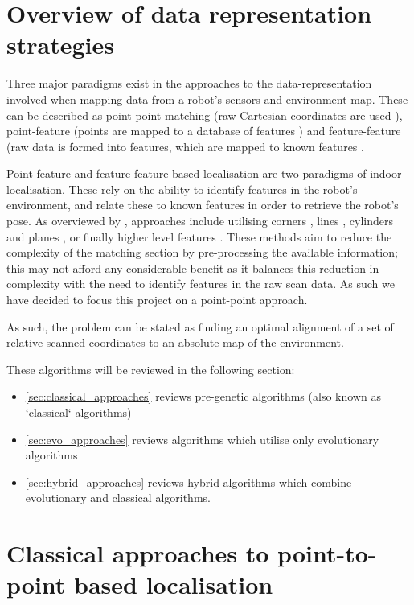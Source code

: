 \documentclass[authoryearcitations]{UoYCSproject}
\begin{document}
\section{Overview of data representation strategies}
Three major paradigms exist in the approaches to the data-representation involved when mapping data from a robot's sensors and environment map. These can be described as point-point matching (raw Cartesian coordinates are used \cite{Lu1997-zv}), point-feature (points are mapped to a database of features \cite{Censi2008-ik}) and feature-feature (raw data is formed into features, which are mapped to known features \cite{Reina2000-vq}. 

Point-feature and feature-feature based localisation are two paradigms of indoor localisation. These rely on the ability to identify features in the robot's environment, and relate these to known features in order to retrieve the robot's pose. As overviewed by \citet{Filliat2003-ay}, approaches include utilising corners \cite{Borghi1995-pi} \cite{Hebert1996-rc}, lines \cite{Moutarlier1990-ld} \cite{Einsele1997-dl}, cylinders and planes \cite{Leonard1990-hx}, or finally higher level features \cite{Ayache1990-ok}. These methods aim to reduce the complexity of the matching section by pre-processing the available information; this may not afford any considerable benefit as it balances this reduction in complexity with the need to identify features in the raw scan data. As such we have decided to focus this project on a point-point approach.

As such, the problem can be stated as finding an optimal alignment of a set of relative scanned coordinates to an absolute map of the environment.

These algorithms will be reviewed in the following section:
\begin{itemize}
	\item \autoref{sec:classical_approaches} reviews pre-genetic algorithms (also known as `classical` algorithms)
	\item \autoref{sec:evo_approaches} reviews algorithms which utilise only evolutionary algorithms
	\item \autoref{sec:hybrid_approaches} reviews hybrid algorithms which combine evolutionary and classical algorithms.
\end{itemize}


\section{Classical approaches to point-to-point based localisation}
\label{sec:classical_approaches}
\end{document}
